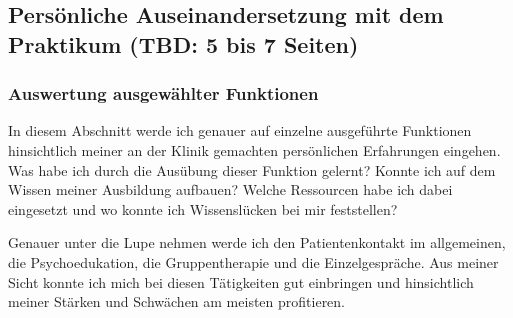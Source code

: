 \subsection{Persönliche Auseinandersetzung mit dem Praktikum (TBD: 5 bis 7 Seiten)} \label{sec:Auseinandersetzung}

\subsubsection{Auswertung ausgewählter Funktionen}
In diesem Abschnitt werde ich genauer auf einzelne ausgeführte Funktionen hinsichtlich meiner an der Klinik gemachten persönlichen Erfahrungen eingehen. Was habe ich durch die Ausübung dieser Funktion gelernt? Konnte ich auf dem Wissen meiner Ausbildung aufbauen? Welche Ressourcen habe ich dabei eingesetzt und wo konnte ich Wissenslücken bei mir feststellen? 

Genauer unter die Lupe nehmen werde ich den Patientenkontakt im allgemeinen, die Psychoedukation, die Gruppentherapie und die Einzelgespräche. Aus meiner Sicht konnte ich mich bei diesen Tätigkeiten gut einbringen und hinsichtlich meiner Stärken und Schwächen am meisten profitieren. 

